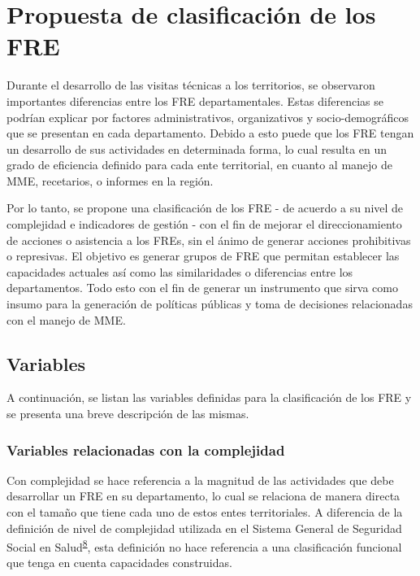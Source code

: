 \documentclass[
]{book}
\begin{document}
\hypertarget{propuesta-de-clasificaciuxf3n-de-los-fre}{%
\section{Propuesta de clasificación de los FRE}\label{propuesta-de-clasificaciuxf3n-de-los-fre}}

Durante el desarrollo de las visitas técnicas a los territorios, se observaron importantes diferencias entre los FRE departamentales. Estas diferencias se podrían explicar por factores administrativos, organizativos y socio-demográficos que se presentan en cada departamento. Debido a esto puede que los FRE tengan un desarrollo de sus actividades en determinada forma, lo cual resulta en un grado de eficiencia definido para cada ente territorial, en cuanto al manejo de MME, recetarios, o informes en la región.

Por lo tanto, se propone una clasificación de los FRE - de acuerdo a su nivel de complejidad e indicadores de gestión - con el fin de mejorar el direccionamiento de acciones o asistencia a los FREs, sin el ánimo de generar acciones prohibitivas o represivas. El objetivo es generar grupos de FRE que permitan establecer las capacidades actuales así como las similaridades o diferencias entre los departamentos. Todo esto con el fin de generar un instrumento que sirva como insumo para la generación de políticas públicas y toma de decisiones relacionadas con el manejo de MME.

\hypertarget{variables}{%
\subsection{Variables}\label{variables}}

A continuación, se listan las variables definidas para la clasificación de los FRE y se presenta una breve descripción de las mismas.

\hypertarget{variables-relacionadas-con-la-complejidad}{%
\subsubsection{Variables relacionadas con la complejidad}\label{variables-relacionadas-con-la-complejidad}}

Con complejidad se hace referencia a la magnitud de las actividades que debe desarrollar un FRE en su departamento, lo cual se relaciona de manera directa con el tamaño que tiene cada uno de estos entes territoriales. A diferencia de la definición de nivel de complejidad utilizada en el Sistema General de Seguridad Social en Salud\textsuperscript{\protect\hyperlink{ref-MinisteriodeSalud1994}{8}}, esta definición no hace referencia a una clasificación funcional que tenga en cuenta capacidades construidas.
\end{document}
